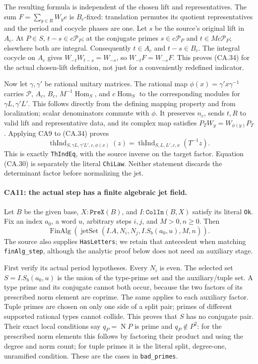 The resulting formula is independent of the chosen lift and
representatives. The sum $F=\sum_{y\in R}W_y e$ is $B_c$-fixed:
translation permutes its quotient representatives and the period
and cocycle phases are one. Let $s$ be the source's original
lift in $A_c$. At $P\in S$, $t-s\in c\mathcal P_P$; at the
conjugate primes $s\in c\mathcal P_P$ and
$t\in Mc\mathcal P_P$; elsewhere both are integral.
Consequently $t\in A_c$ and $t-s\in B_c$.
The integral cocycle on $A_c$ gives
$W_{-t}W_{t-s}=W_{-s}$, so $W_{-t}F=W_{-s}F$.
This proves (CA.34) for the actual chosen-lift definition, not
just for a conveniently redefined indicator.

Now let $\gamma,\gamma'$ be rational unitary matrices.
The rational map $\phi(x)=\gamma'x\gamma^{-1}$ carries
$\mathcal P$, $A_c$, $B_c$, $M^{-1}\operatorname{Hom}_S$,
and $c\operatorname{Hom}_S$ to the corresponding modules for
$\gamma L,\gamma'L'$. This follows directly from the defining
mapping property and from localization; scalar denominators
commute with $\phi$. It preserves $n_c$, sends $t,R$ to valid
lift and representative data, and its complex map satisfies
$P_TW_y=W_{\phi(y)}P_T$. Applying CA9 to (CA.34) proves
\[
 \operatorname{thInd}_{S,\gamma L,\gamma'L',c,\phi(x)}(z)
       =\operatorname{thInd}_{S,L,L',c,x}(T^{-1}z).
 \tag{CA.35}
\]
This is exactly \texttt{ThIndEq}, with the source inverse on
the target factor. Equation (CA.30) is separately the literal
\texttt{ChiLaw}. Neither statement discards the determinant
factor before normalizing the jet.

\paragraph{CA11: the actual step has a finite algebraic jet field.}
Let $B$ be the given base, $X:\texttt{PreX}(B)$, and
$I:\texttt{ColIn}(B,X)$ satisfy its literal \texttt{Ok}.
Fix an index $a_0$, a word $u$, arbitrary steps $i,j$, and
$M>0,n\ge0$. Then
\[
 \operatorname{FinAlg}\!\left(
  \operatorname{jetSet}(I.A,N_i,N_j,I.S_b(a_0,u),M,n)\right).
 \tag{CA.36}
\]
The source also supplies \texttt{HasLetters}; we retain that
antecedent when matching \texttt{finAlg\_step}, although the
analytic proof below does not need an auxiliary stage.

First verify its actual period hypotheses. Every $N_i$ is even.
The selected set $S=I.S_b(a_0,u)$ is the union of the type-prime
set and the auxiliary/tuple set. A type prime and its conjugate
cannot both occur, because the two factors of its prescribed
norm element are coprime. The same applies to each auxiliary
factor. Tuple primes are chosen on only one side of a split
pair; primes of different supported rational types cannot collide.
This proves that $S$ has no conjugate pair. Their exact local
conditions say $q_P=\operatorname N P$ is prime and
$q_P\notin P^2$: for the prescribed norm elements this follows
by factoring their product and using the degree and norm count;
for tuple primes it is the literal split, degree-one, unramified
condition. These are the cases in \texttt{bad\_primes}.

